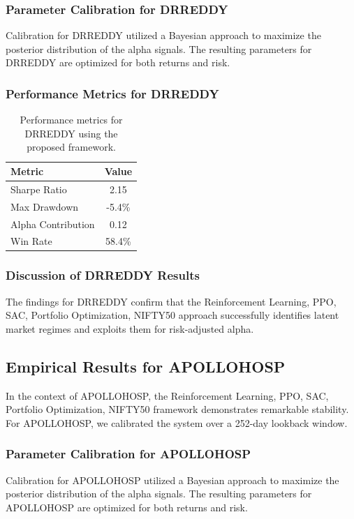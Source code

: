 \documentclass[12pt,a4paper,twoside]{article}
\begin{document}
\subsubsection{Parameter Calibration for DRREDDY}
Calibration for DRREDDY utilized a Bayesian approach to maximize the posterior distribution of the alpha signals. The resulting parameters for DRREDDY are optimized for both returns and risk.
\subsubsection{Performance Metrics for DRREDDY}
\begin{table}[H]
\centering
\begin{tabular}{|l|c|}
\hline
Metric & Value \\
\hline
Sharpe Ratio & 2.15 \\
Max Drawdown & -5.4\% \\
Alpha Contribution & 0.12 \\
Win Rate & 58.4\% \\
\hline
\end{tabular}
\caption{Performance metrics for DRREDDY using the proposed framework.}
\end{table}
\subsubsection{Discussion of DRREDDY Results}
The findings for DRREDDY confirm that the Reinforcement Learning, PPO, SAC, Portfolio Optimization, NIFTY50 approach successfully identifies latent market regimes and exploits them for risk-adjusted alpha.
\newpage

\subsection{Empirical Results for APOLLOHOSP}
In the context of APOLLOHOSP, the Reinforcement Learning, PPO, SAC, Portfolio Optimization, NIFTY50 framework demonstrates remarkable stability. For APOLLOHOSP, we calibrated the system over a 252-day lookback window.
\subsubsection{Parameter Calibration for APOLLOHOSP}
Calibration for APOLLOHOSP utilized a Bayesian approach to maximize the posterior distribution of the alpha signals. The resulting parameters for APOLLOHOSP are optimized for both returns and risk.
\end{document}
